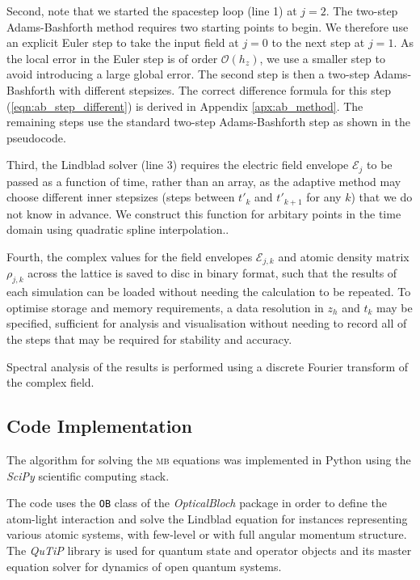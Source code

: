     Second, note that we started the spacestep loop (line 1) at $j\!=\!2$. The
    two-step Adams-Bashforth method requires two starting points to begin. We
    therefore use an explicit Euler step to take the input field at $j\!=\!0$ to
    the next step at $j\!=\!1$. As the local error in the Euler step is of order
    $\mathcal{O}(h_z)$, we use a smaller step to avoid introducing a large
    global error. The second step is then a two-step Adams-Bashforth with
    different stepsizes. The correct difference formula for this step
    (\ref{eqn:ab_step_different}) is derived in Appendix \ref{apx:ab_method}.
    The remaining steps use the standard two-step Adams-Bashforth step as shown
    in the pseudocode.

    Third, the Lindblad solver (line 3) requires the electric field envelope
    $\mathcal{E}_j$ to be passed as a function of time, rather than an array, as
    the adaptive method may choose different inner stepsizes (\ie steps between
    $t'_k$ and $t'_{k+1}$ for any $k$) that we do not know in advance. We
    construct this function for arbitary points in the time domain using
    quadratic spline interpolation.\cite{press2007numerical,DeBoor1972}.

    Fourth, the complex values for the field envelopes $\mathcal{E}_{j,k}$ and
    atomic density matrix $\rho_{j,k}$ across the lattice is saved to disc in
    binary format, such that the results of each simulation can be loaded
    without needing the calculation to be repeated. To optimise storage and
    memory requirements, a data resolution in $z_h$ and $t_k$ may be specified,
    sufficient for analysis and visualisation without needing to record all of
    the steps that may be required for stability and accuracy.

    Spectral analysis of the results is performed using a discrete Fourier
    transform of the complex field.\cite{press2007numerical}   

    \subsection{Code Implementation}

    The algorithm for solving the \textsc{mb} equations was implemented in
    Python using the \textit{SciPy} scientific computing
    stack\cite{VanDerWalt2011,Jones}.

    The code uses the \texttt{OB} class of the \textit{OpticalBloch} package in
    order to define the atom-light interaction and solve the Lindblad equation
    for instances representing various atomic systems, with few-level or with
    full angular momentum structure. The \textit{QuTiP} library\cite{Nation2013}
    is used for quantum state and operator objects and its master equation
    solver for dynamics of open quantum systems.

